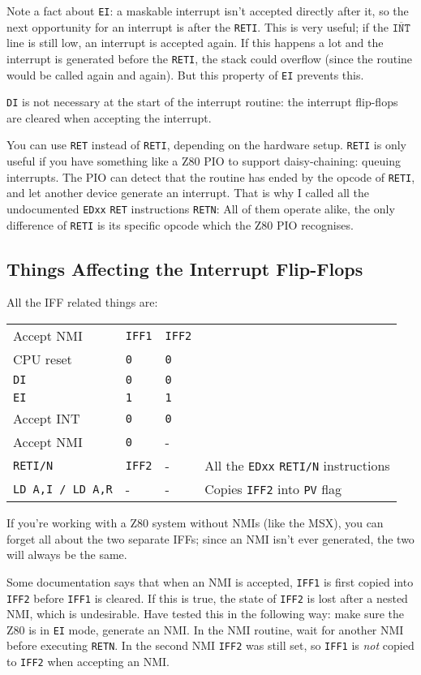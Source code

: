 Note a fact about {\tt EI}: a maskable interrupt isn't accepted directly after it, so the next opportunity for an interrupt is after the {\tt RETI}. This is very useful; if the $\mathtt{\overline{INT}}$ line is still low, an interrupt is accepted again.  If this happens a lot and the interrupt is generated before the {\tt RETI}, the stack could overflow (since the routine would be called again and again). But this property of {\tt EI} prevents this.

{\tt DI} is not necessary at the start of the interrupt routine: the interrupt flip-flops are cleared when accepting the interrupt.

You can use {\tt RET} instead of {\tt RETI}, depending on the hardware setup. {\tt RETI} is only useful if you have something like a Z80 PIO to support daisy-chaining: queuing interrupts. The PIO can detect that the routine has ended by the opcode of {\tt RETI}, and let another device generate an interrupt. That is why I called all the undocumented {\tt EDxx} {\tt RET} instructions {\tt RETN}: All of them operate alike, the only difference of {\tt RETI} is its specific opcode which the Z80 PIO recognises.


\subsection{Things Affecting the Interrupt Flip-Flops}
\label{flipflop}

All the IFF related things are:

\begin{tabular}{llll}
	Accept NMI	& {\tt IFF1}	& {\tt IFF2} \\
	CPU reset	& {\tt 0}		& {\tt 0}\\
	{\tt DI}	& {\tt 0}		& {\tt 0}\\
	{\tt EI}	& {\tt 1}		& {\tt 1}\\
	Accept INT	& {\tt 0}		& {\tt 0}\\
	Accept NMI	& {\tt 0}		& -\\
	{\tt RETI/N}& {\tt IFF2}	& - & All the {\tt EDxx} {\tt RETI/N} instructions\\
	{\tt LD A,I / LD A,R} & - & - & Copies {\tt IFF2} into {\tt PV} flag
\end{tabular}

If you're working with a Z80 system without NMIs (like the MSX), you can forget all about the two separate IFFs; since an NMI isn't ever generated, the two will always be the same. 

Some documentation says that when an NMI is accepted, {\tt IFF1} is first copied into {\tt IFF2} before {\tt IFF1} is cleared. If this is true, the state of {\tt IFF2} is lost after a nested NMI, which is undesirable. Have tested this in the following way: make sure the Z80 is in {\tt EI} mode, generate an NMI. In the NMI routine, wait for another NMI before executing {\tt RETN}. In the second NMI {\tt IFF2} was still set, so {\tt IFF1} is {\em not} copied to {\tt IFF2} when accepting an NMI.

